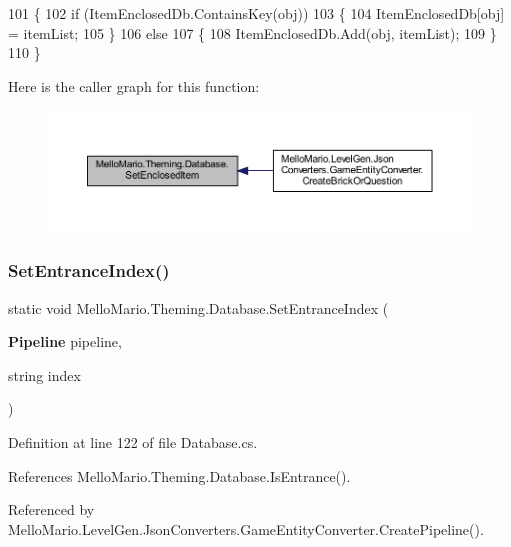 \begin{DoxyCode}
101         \{
102             \textcolor{keywordflow}{if} (ItemEnclosedDb.ContainsKey(obj))
103             \{
104                 ItemEnclosedDb[obj] = itemList;
105             \}
106             \textcolor{keywordflow}{else}
107             \{
108                 ItemEnclosedDb.Add(obj, itemList);
109             \}
110         \}
\end{DoxyCode}
Here is the caller graph for this function\+:
\nopagebreak
\begin{figure}[H]
\begin{center}
\leavevmode
\includegraphics[width=350pt]{classMelloMario_1_1Theming_1_1Database_abc8cd8416d5c045bd7bb18fc66363465_icgraph}
\end{center}
\end{figure}
\mbox{\label{classMelloMario_1_1Theming_1_1Database_a05ce5701743a3414d738b840298694ed}} 
\subsubsection{Set\+Entrance\+Index()}
{\footnotesize\ttfamily static void Mello\+Mario.\+Theming.\+Database.\+Set\+Entrance\+Index (\begin{DoxyParamCaption}\item[{\textbf{ Pipeline}}]{pipeline,  }\item[{string}]{index }\end{DoxyParamCaption})\hspace{0.3cm}{\ttfamily [static]}}



Definition at line 122 of file Database.\+cs.



References Mello\+Mario.\+Theming.\+Database.\+Is\+Entrance().



Referenced by Mello\+Mario.\+Level\+Gen.\+Json\+Converters.\+Game\+Entity\+Converter.\+Create\+Pipeline().


